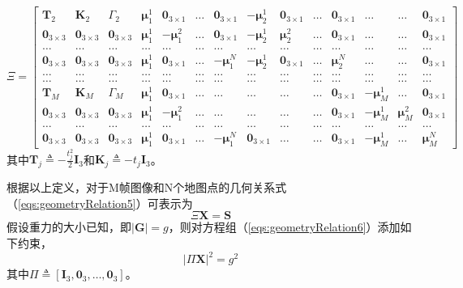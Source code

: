 \documentclass{article}
\begin{document}
\begin{equation}
    \Xi=\left[\begin{array}{cccccccccccccc}
        \textbf{T}_2&\textbf{K}_2&\Gamma_2&\mathbf{\mu}_1^1&\textbf{0}_{3\times 1}&\dots&\textbf{0}_{3\times 1}&
        -\mathbf{\mu}_2^1&\textbf{0}_{3\times 1}&\dots&\textbf{0}_{3\times 1}&\dots&\dots&\textbf{0}_{3\times 1}\\
        \textbf{0}_{3\times 3}&\textbf{0}_{3\times 3}&\textbf{0}_{3\times 3}&\mathbf{\mu}_1^1&-\mathbf{\mu}_1^2&\dots&\textbf{0}_{3\times 1}&
        -\mathbf{\mu}_2^1&\mathbf{\mu}_2^2&\dots&\textbf{0}_{3\times 1}&\dots&\dots&\textbf{0}_{3\times 1}\\
        \dots&\dots&\dots&\dots&\dots&\dots&\dots&\dots&\dots&\dots&\dots&\dots&\dots&\dots\\
        \textbf{0}_{3\times 3}&\textbf{0}_{3\times 3}&\textbf{0}_{3\times 3}&\mathbf{\mu}_1^1&\textbf{0}_{3\times 1}&\dots&-\mathbf{\mu}_1^N&
        -\mathbf{\mu}_2^1&\textbf{0}_{3\times 1}&\dots&\mathbf{\mu}_2^N&\dots&\dots&\textbf{0}_{3\times 1}\\
        \dots&\dots&\dots&\dots&\dots&\dots&\dots&\dots&\dots&\dots&\dots&\dots&\dots&\dots\\
        \dots&\dots&\dots&\dots&\dots&\dots&\dots&\dots&\dots&\dots&\dots&\dots&\dots&\dots\\
        \textbf{T}_M&\textbf{K}_M&\Gamma_M&\mathbf{\mu}_1^1&\textbf{0}_{3\times 1}&\dots&\dots&
        \dots&\dots&\dots&\textbf{0}_{3\times 1}&-\mathbf{\mu}_M^1&\dots&\textbf{0}_{3\times 1}\\
        \textbf{0}_{3\times 3}&\textbf{0}_{3\times 3}&\textbf{0}_{3\times 3}&\mathbf{\mu}_1^1&-\mathbf{\mu}_1^2&\dots&\dots&
        \dots&\dots&\dots&\textbf{0}_{3\times 1}&-\mathbf{\mu}_M^1&\mathbf{\mu}_M^2&\textbf{0}_{3\times 1}\\
        \dots&\dots&\dots&\dots&\dots&\dots&\dots&\dots&\dots&\dots&\dots&\dots&\dots&\dots\\
        \textbf{0}_{3\times 3}&\textbf{0}_{3\times 3}&\textbf{0}_{3\times 3}&\mathbf{\mu}_1^1&\textbf{0}_{3\times 1}&\dots&-\mathbf{\mu}_1^N&
        \textbf{0}_{3\times 1}&\dots&\dots&\textbf{0}_{3\times 1}&-\mathbf{\mu}_M^1&\dots&\mathbf{\mu}_M^N
    \end{array}\right]
\end{equation}
其中$\textbf{T}_j\triangleq -\frac{t_j^2}{2}\textbf{I}_3$和$\textbf{K}_j\triangleq -t_j\textbf{I}_3$。

\par
根据以上定义，对于M帧图像和N个地图点的几何关系式（\ref{eqs:geometryRelation5}）可表示为
\begin{equation}\label{eqs:geometryRelation6}
    \Xi\textbf{X}=\textbf{S}
\end{equation}
假设重力的大小已知，即$|\textbf{G}|=g$，则对方程组（\ref{eqs:geometryRelation6}）添加如下约束，
\begin{equation}\label{eqs:geometryRelation7}
    |\Pi\textbf{X}|^2=g^2
\end{equation}
其中$\Pi\triangleq \left[\textbf{I}_3,\textbf{0}_3,\dots,\textbf{0}_3\right]$。
\end{document}
